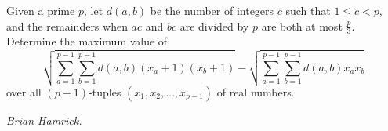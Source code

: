 Given a prime $p$, let $d(a,b)$ be the number of integers $c$ such that $1 \leq c < p$, and the remainders when $ac$ and $bc$ are divided by $p$ are both at most $\frac{p}{3}$. Determine the maximum value of \[\sqrt{\sum_{a=1}^{p-1}\sum_{b=1}^{p-1}d(a,b)(x_a + 1)(x_b + 1)} - \sqrt{\sum_{a=1}^{p-1}\sum_{b=1}^{p-1}d(a,b)x_ax_b}\] over all $(p-1)$-tuples $(x_1,x_2,\ldots,x_{p-1})$ of real numbers.

\textit{Brian Hamrick.}